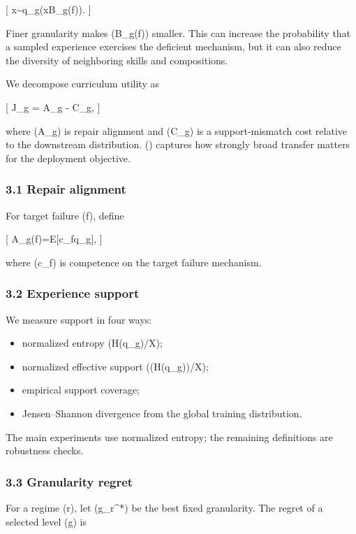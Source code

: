 \documentclass[
]{article}
\providecommand{\tightlist}{%
  \setlength{\itemsep}{0pt}\setlength{\parskip}{0pt}}
\begin{document}
{[} x\sim q\_g(x\mid B\_g(f)). {]}

Finer granularity makes (B\_g(f)) smaller. This can increase the
probability that a sampled experience exercises the deficient mechanism,
but it can also reduce the diversity of neighboring skills and
compositions.

We decompose curriculum utility as

{[} J\_g = A\_g - \lambda C\_g, {]}

where (A\_g) is repair alignment and (C\_g) is a support-mismatch cost
relative to the downstream distribution. (\lambda) captures how strongly
broad transfer matters for the deployment objective.

\subsubsection{3.1 Repair alignment}\label{repair-alignment}

For target failure (f), define

{[} A\_g(f)=\mathbb E{[}\Delta c\_f\mid q\_g{]}, {]}

where (c\_f) is competence on the target failure mechanism.

\subsubsection{3.2 Experience support}\label{experience-support}

We measure support in four ways:

\begin{itemize}
\tightlist
\item
  normalized entropy (H(q\_g)/\log \textbar{}\mathcal X\textbar);
\item
  normalized effective support
  (\exp(H(q\_g))/\textbar{}\mathcal X\textbar);
\item
  empirical support coverage;
\item
  Jensen--Shannon divergence from the global training distribution.
\end{itemize}

The main experiments use normalized entropy; the remaining definitions
are robustness checks.

\subsubsection{3.3 Granularity regret}\label{granularity-regret}

For a regime (r), let (g\_r\^{}*) be the best fixed granularity. The
regret of a selected level (\hat g) is
\end{document}
